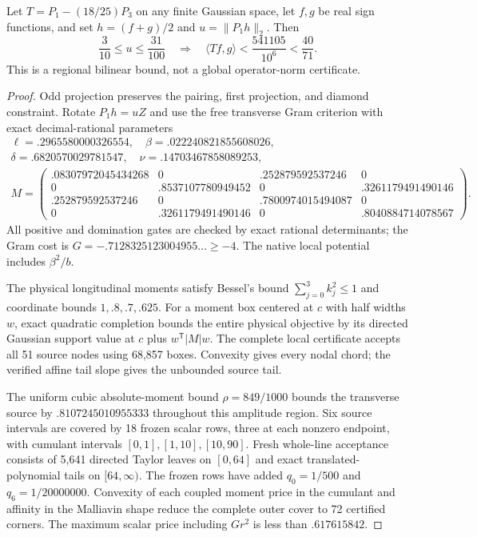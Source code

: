\begin{proposition}
Let $T=P_1-(18/25)P_3$ on any finite Gaussian space, let $f,g$ be real
sign functions, and set $h=(f+g)/2$ and $u=\|P_1h\|_2$.
Then
\[
 \frac3{10}\le u\le\frac{31}{100}
 \quad\Longrightarrow\quad
 \langle Tf,g\rangle<\frac{541105}{10^6}<\frac{40}{71}.
\]
This is a regional bilinear bound, not a global operator-norm certificate.
\end{proposition}

\begin{proof}
Odd projection preserves the pairing, first projection, and diamond
constraint. Rotate $P_1h=uZ$ and use the free transverse Gram criterion
with exact decimal-rational parameters
\[
\begin{gathered}
\ell=.2965580000326554,\quad\beta=.022240821855608026,\\
\delta=.6820570029781547,\quad\nu=.14703467858089253,\\
M=\begin{pmatrix}
.08307972045434268&0&.252879592537246&0\\
0&.8537107780949452&0&.3261179491490146\\
.252879592537246&0&.7800974015494087&0\\
0&.3261179491490146&0&.8040884714078567
\end{pmatrix}.
\end{gathered}
\]
All positive and domination gates are checked by exact rational
determinants; the Gram cost is $G=-.7128325123004955\ldots\ge-4$.
The native local potential includes $\beta^2/b$.

The physical longitudinal moments satisfy Bessel's bound
$\sum_{j=0}^3k_j^2\le1$ and coordinate bounds $1,.8,.7,.625$.
For a moment box centered at $c$ with half widths $w$, exact quadratic
completion bounds the entire physical objective by its directed
Gaussian support value at $c$ plus $w^{\mathsf T}|M|w$.
The complete local certificate accepts all 51 source nodes using
68,857 boxes. Convexity gives every nodal chord; the verified affine
tail slope gives the unbounded source tail.

The uniform cubic absolute-moment bound $\rho=849/1000$ bounds the
transverse source by $.8107245010955333$ throughout this amplitude region.
Six source intervals are covered by 18 frozen scalar rows, three at each
nonzero endpoint, with cumulant intervals $[0,1],[1,10],[10,90]$.
Fresh whole-line acceptance consists of 5,641 directed Taylor leaves
on $[0,64]$ and exact translated-polynomial tails on $[64,\infty)$.
The frozen rows have added $q_0=1/500$ and $q_6=1/20000000$.
Convexity of each coupled moment price in the cumulant and affinity in
the Malliavin shape reduce the complete outer cover to 72 certified
corners. The maximum scalar price including $Gr^2$ is less than
$.617615842$.


\end{proof}
